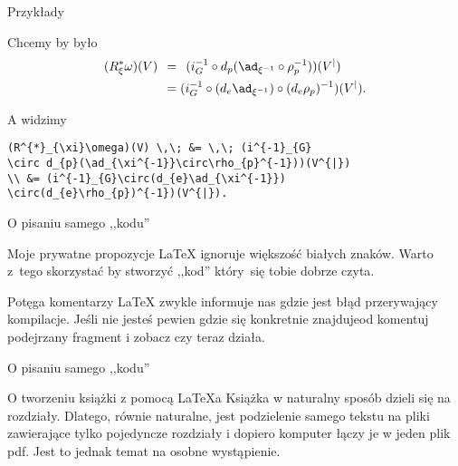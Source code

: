 \documentclass{beamer}  %
\begin{document}
\begin{frame}[fragile]{Przykłady}

  \begin{block}{Chcemy by było}
    \begin{equation}
      \begin{split}
        (R^{*}_{\xi}\omega)(V) \,\; &= \,\; (i^{-1}_{G}\circ d_{p}(\ad_{\xi^{-1}}\circ\rho_{p}^{-1}))(V^{|}) \\
        &=
        (i^{-1}_{G}\circ(d_{e}\ad_{\xi^{-1}})\circ(d_{e}\rho_{p})^{-1})(V^{|}).
      \end{split}
    \end{equation}
  \end{block}
  \pause

  \begin{block}{A widzimy}
\begin{verbatim}
(R^{*}_{\xi}\omega)(V) \,\; &= \,\; (i^{-1}_{G}
\circ d_{p}(\ad_{\xi^{-1}}\circ\rho_{p}^{-1}))(V^{|}) 
\\ &= (i^{-1}_{G}\circ(d_{e}\ad_{\xi^{-1}})
\circ(d_{e}\rho_{p})^{-1})(V^{|}).
\end{verbatim}
  \end{block}

\end{frame}



\begin{frame}{O pisaniu samego ,,kodu''}

  \begin{block}{Moje prywatne propozycje}
    \LaTeX{} ignoruje większość białych znaków. Warto z~tego
    skorzystać by stworzyć ,,kod'' który~się tobie dobrze czyta.
  \end{block}

  \begin{block}{Potęga komentarzy}
    \LaTeX{} zwykle informuje nas gdzie jest błąd przerywający
    kompilacje. Jeśli nie jesteś pewien gdzie się konkretnie
    znajduje\linebreak od komentuj podejrzany fragment i zobacz czy
    teraz działa.
  \end{block}

\end{frame}


\begin{frame}{O pisaniu samego ,,kodu''}

  \begin{block}{O tworzeniu książki z pomocą \LaTeX a}
    Książka w naturalny sposób dzieli się na rozdziały. Dlatego,
    równie naturalne, jest podzielenie samego tekstu na pliki
    zawierające tylko pojedyncze rozdziały i dopiero komputer łączy je
    w jeden plik pdf. Jest to jednak temat na osobne wystąpienie.
  \end{block}

\end{frame}
\end{document}
